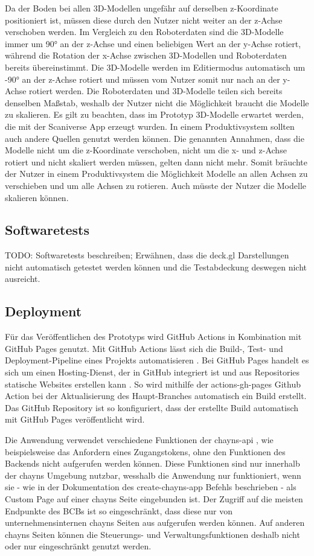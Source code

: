 Da der Boden bei allen 3D-Modellen ungefähr auf derselben z-Koordinate positioniert ist, müssen diese durch den Nutzer nicht weiter an der z-Achse verschoben werden. Im Vergleich zu den Roboterdaten sind die 3D-Modelle immer um 90° an der z-Achse und einen beliebigen Wert an der y-Achse rotiert, während die Rotation der x-Achse zwischen 3D-Modellen und Roboterdaten bereits übereinstimmt. Die 3D-Modelle werden im Editiermodus automatisch um -90° an der z-Achse rotiert und müssen vom Nutzer somit nur nach an der y-Achse rotiert werden. Die Roboterdaten und 3D-Modelle teilen sich bereits denselben Maßstab, weshalb der Nutzer nicht die Möglichkeit braucht die Modelle zu skalieren. Es gilt zu beachten, dass im Prototyp 3D-Modelle erwartet werden, die mit der Scaniverse App erzeugt wurden. In einem Produktivsystem sollten auch andere Quellen genutzt werden können. Die genannten Annahmen, dass die Modelle nicht um die z-Koordinate verschoben, nicht um die x- und z-Achse rotiert und nicht skaliert werden müssen, gelten dann nicht mehr. Somit bräuchte der Nutzer in einem Produktivsystem die Möglichkeit Modelle an allen Achsen zu verschieben und um alle Achsen zu rotieren. Auch müsste der Nutzer die Modelle skalieren können.

\subsection{Softwaretests}
TODO: Softwaretests beschreiben; Erwähnen, dass die deck.gl Darstellungen nicht automatisch getestet werden können und die Testabdeckung deswegen nicht ausreicht.

\subsection{Deployment}
Für das Veröffentlichen des Prototyps wird GitHub Actions in Kombination mit GitHub Pages genutzt. Mit GitHub Actions lässt sich die Build-, Test- und Deployment-Pipeline eines Projekts automatisieren \cite{GitHubActions}. Bei GitHub Pages handelt es sich um einen Hosting-Dienst, der in GitHub integriert ist und aus Repositories statische Websites erstellen kann \cite{GitHubPages}. So wird mithilfe der actions-gh-pages Github Action \cite{ActionsGhPages} bei der Aktualisierung des Haupt-Branches automatisch ein Build erstellt. Das GitHub Repository ist so konfiguriert, dass der erstellte Build automatisch mit GitHub Pages veröffentlicht wird.

Die Anwendung verwendet verschiedene Funktionen der chayns-api \cite{ChaynsApi}, wie beispielsweise das Anfordern eines Zugangstokens, ohne den Funktionen des Backends nicht aufgerufen werden können. Diese Funktionen sind nur innerhalb der chayns Umgebung nutzbar, wesshalb die Anwendung nur funktioniert, wenn sie - wie in der Dokumentation des create-chayns-app Befehls beschrieben \cite{CreateChaynsApp} - als Custom Page auf einer chayns Seite eingebunden ist. Der Zugriff auf die meisten Endpunkte des \ac{BCB}s ist so eingeschränkt, dass diese nur von unternehmensinternen chayns Seiten aus aufgerufen werden können. Auf anderen chayns Seiten können die Steuerungs- und Verwaltungsfunktionen deshalb nicht oder nur eingeschränkt genutzt werden.
